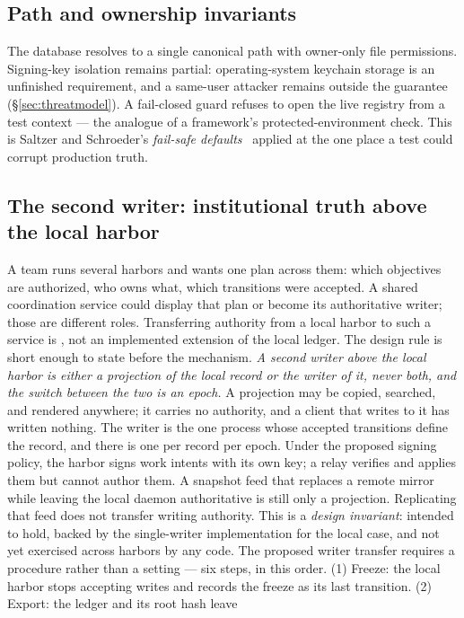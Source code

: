 \documentclass[11pt,a4paper]{article}
\theoremstyle{definition}
\theoremstyle{remark}
\begin{document}
\subsection{Path and ownership invariants}
The database resolves to a single canonical path with owner-only file permissions.
Signing-key isolation remains partial: operating-system keychain storage is an
unfinished requirement, and a same-user attacker remains outside the guarantee
(\S\ref{sec:threatmodel}). A fail-closed guard refuses to open the live registry
from a test context --- the analogue of a framework's protected-environment check.
This is Saltzer and Schroeder's \emph{fail-safe defaults}~
applied at the one place a test could corrupt production truth.
\subsection{The second writer: institutional truth above the local harbor}
\label{sec:second-writer}
A team runs several harbors and wants one plan across them: which objectives
are authorized, who owns what, which transitions were accepted. A shared
coordination service could display that plan or become its authoritative writer;
those are different roles. Transferring authority from a local harbor to such a
service is \Designed{}, not an implemented extension of the local ledger.
The design rule is short enough to state before the mechanism. \emph{A second
writer above the local harbor is either a projection of the local record or
the writer of it, never both, and the switch between the two is an epoch.} A
projection may be copied, searched, and rendered anywhere; it carries no
authority, and a client that writes to it has written nothing. The writer is
the one process whose accepted transitions define the record, and there is
one per record per epoch. Under the proposed signing policy, the harbor signs
work intents with its own key; a relay verifies and applies them but cannot author
them. A snapshot feed that replaces a remote mirror while leaving the local
daemon authoritative is still only a projection. Replicating that feed does not
transfer writing authority. This is a \emph{design invariant}: intended to hold, backed by the
single-writer implementation for the local case, and not yet exercised across
harbors by any code.
The proposed writer transfer requires a procedure rather than a setting ---
six steps, in this order. (1) Freeze: the local harbor stops accepting writes and records the
freeze as its last transition. (2) Export: the ledger and its root hash leave
\end{document}
